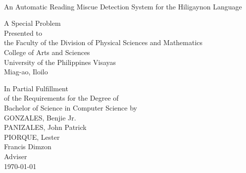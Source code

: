 \begin{titlepage}
\centering

 \\
\vspace{0.5cm}
An Automatic Reading Miscue Detection System for the Hiligaynon Language

\vspace{1.75cm}
A Special Problem\\
Presented to\\
the Faculty of the Division of Physical Sciences and Mathematics\\
College of Arts and Sciences\\
University of the Philippines Visayas\\
Miag-ao, Iloilo

\vspace{1.75cm}
In Partial Fulfillment\\
of the Requirements for the Degree of\\
Bachelor of Science in Computer Science
\vspace{1.75cm}
by\\

\vspace{1cm}
GONZALES, Benjie Jr.  \\
PANIZALES, John Patrick\\
PIORQUE, Lester \\

\vspace{1.75cm}
Francis Dimzon\\
Adviser\\

\vspace{1.75cm}
\today
\end{titlepage}
